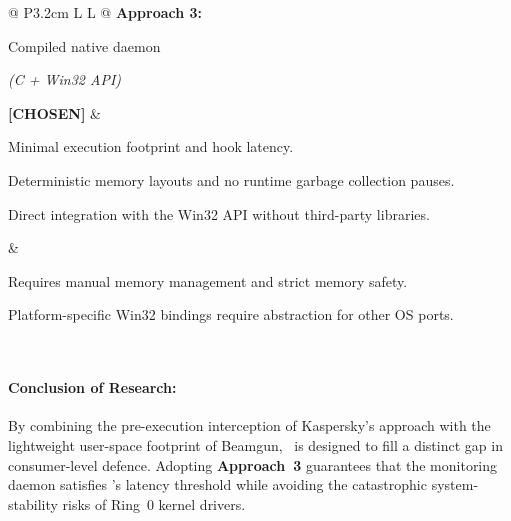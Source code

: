 {\begin{xltabular}{\textwidth}{@{} P{3.2cm} L L @{}}
	\textbf{Approach 3:}\par Compiled native daemon\par\textit{\footnotesize (C + Win32 API)}\par\textbf{[CHOSEN]} &
	\begin{tablelist}
		\item Minimal execution footprint and hook latency.
		\item Deterministic memory layouts and no runtime garbage collection pauses.
		\item Direct integration with the Win32 API without third-party libraries.
	\end{tablelist} &
	\begin{tablelist}
		\item Requires manual memory management and strict memory safety.
		\item Platform-specific Win32 bindings require abstraction for other OS ports.
	\end{tablelist} \\
\end{xltabular}
}

\paragraph{Conclusion of Research:}
By combining the pre-execution interception of Kaspersky's approach with the lightweight user-space footprint of Beamgun, \projectNameFormatted\ is designed to fill a distinct gap in consumer-level defence. Adopting \textbf{Approach~3} guarantees that the monitoring daemon satisfies \stakeholdersPU's latency threshold while avoiding the catastrophic system-stability risks of Ring~0 kernel drivers.
